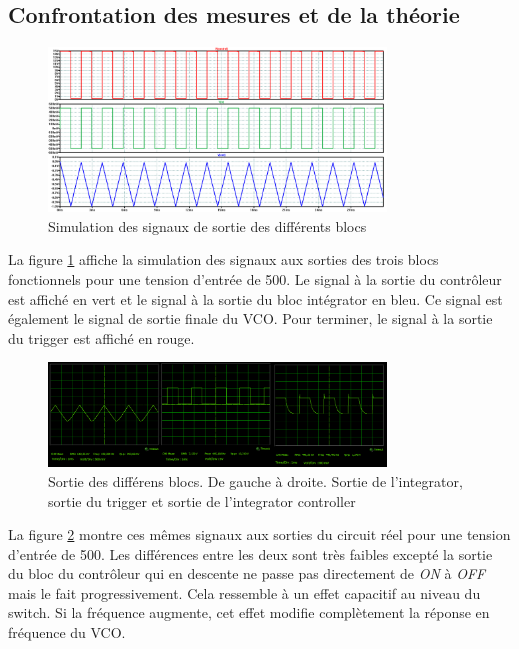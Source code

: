 \subsection{Confrontation  des mesures et de la théorie}
\begin{figure}[ht]
	\centering
	\includegraphics[width=0.8\textwidth]{img-vco/vco_simulation.png}
	\caption{Simulation des signaux de sortie des différents blocs}
	\label{fig:out_vco_th}
\end{figure}

La figure \ref{fig:out_vco_th} affiche la simulation des signaux 
aux sorties des trois blocs fonctionnels pour une tension d'entrée
de \unit{500}{\milli\volt}. Le signal à la sortie du contrôleur est
affiché en vert et le signal à la sortie du bloc intégrator en bleu.
 Ce signal est également le signal de sortie finale du VCO. Pour terminer, le signal à la sortie du trigger est affiché en rouge.

\begin{figure}[ht]                                       
	\centering
	\includegraphics[width=0.8\textwidth]{img-vco/vco_real_out.png}
	\caption{Sortie des différens blocs. De gauche à droite. Sortie de l'integrator, sortie du trigger et sortie de l'integrator controller}
	\label{fig:out_vco_real}
\end{figure}

La figure \ref{fig:out_vco_real} montre ces mêmes signaux aux sorties
du circuit réel pour une tension d'entrée de \unit{500}{\milli\volt}. 
Les différences entre les deux sont très faibles excepté la sortie du
bloc du contrôleur qui en descente ne passe pas directement 
de \textit{ON} à \textit{OFF} mais le fait progressivement. Cela ressemble à un effet 
capacitif au niveau du switch. Si la fréquence augmente, cet effet 
modifie complètement la réponse en fréquence du VCO.


